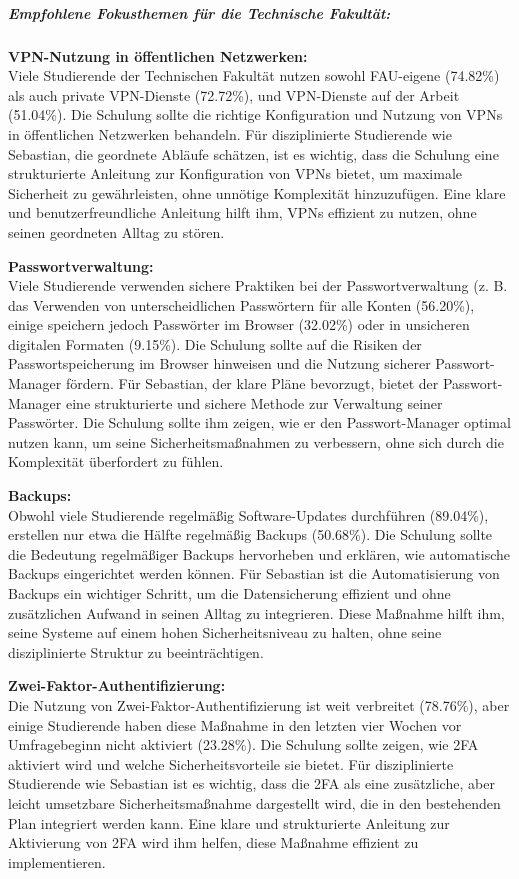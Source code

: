 \documentclass[german,report]{i1thesis}
\begin{document}
\subparagraph{Empfohlene Fokusthemen für die Technische Fakultät:}
\mbox{}

\textbf{VPN-Nutzung in öffentlichen Netzwerken:}\\
Viele Studierende der Technischen Fakultät nutzen sowohl FAU-eigene (74.82\%) als auch private VPN-Dienste (72.72\%), und VPN-Dienste auf der Arbeit (51.04\%). Die Schulung sollte die richtige Konfiguration und Nutzung von VPNs in öffentlichen Netzwerken behandeln. Für disziplinierte Studierende wie Sebastian, die geordnete Abläufe schätzen, ist es wichtig, dass die Schulung eine strukturierte Anleitung zur Konfiguration von VPNs bietet, um maximale Sicherheit zu gewährleisten, ohne unnötige Komplexität hinzuzufügen. Eine klare und benutzerfreundliche Anleitung hilft ihm, VPNs effizient zu nutzen, ohne seinen geordneten Alltag zu stören.

\textbf{Passwortverwaltung:}\\
Viele Studierende verwenden sichere Praktiken bei der Passwortverwaltung (z. B. das Verwenden von unterscheidlichen Passwörtern für alle Konten (56.20\%), einige speichern jedoch Passwörter im Browser (32.02\%) oder in unsicheren digitalen Formaten (9.15\%). Die Schulung sollte auf die Risiken der Passwortspeicherung im Browser hinweisen und die Nutzung sicherer Passwort-Manager fördern. Für Sebastian, der klare Pläne bevorzugt, bietet der Passwort-Manager eine strukturierte und sichere Methode zur Verwaltung seiner Passwörter. Die Schulung sollte ihm zeigen, wie er den Passwort-Manager optimal nutzen kann, um seine Sicherheitsmaßnahmen zu verbessern, ohne sich durch die Komplexität überfordert zu fühlen.

\textbf{Backups:}\\
Obwohl viele Studierende regelmäßig Software-Updates durchführen (89.04\%), erstellen nur etwa die Hälfte regelmäßig Backups (50.68\%). Die Schulung sollte die Bedeutung regelmäßiger Backups hervorheben und erklären, wie automatische Backups eingerichtet werden können. Für Sebastian ist die Automatisierung von Backups ein wichtiger Schritt, um die Datensicherung effizient und ohne zusätzlichen Aufwand in seinen Alltag zu integrieren. Diese Maßnahme hilft ihm, seine Systeme auf einem hohen Sicherheitsniveau zu halten, ohne seine disziplinierte Struktur zu beeinträchtigen.

\textbf{Zwei-Faktor-Authentifizierung:}\\
Die Nutzung von Zwei-Faktor-Authentifizierung ist weit verbreitet (78.76\%), aber einige Studierende haben diese Maßnahme in den letzten vier Wochen vor Umfragebeginn nicht aktiviert (23.28\%). Die Schulung sollte zeigen, wie 2FA aktiviert wird und welche Sicherheitsvorteile sie bietet. Für disziplinierte Studierende wie Sebastian ist es wichtig, dass die 2FA als eine zusätzliche, aber leicht umsetzbare Sicherheitsmaßnahme dargestellt wird, die in den bestehenden Plan integriert werden kann. Eine klare und strukturierte Anleitung zur Aktivierung von 2FA wird ihm helfen, diese Maßnahme effizient zu implementieren.
\end{document}
